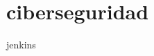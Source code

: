\chapter{ciberseguridad }
\hypertarget{md__r_e_a_d_m_e}{}\label{md__r_e_a_d_m_e}
\label{md__r_e_a_d_m_e_autotoc_md0}%
%


jenkins 